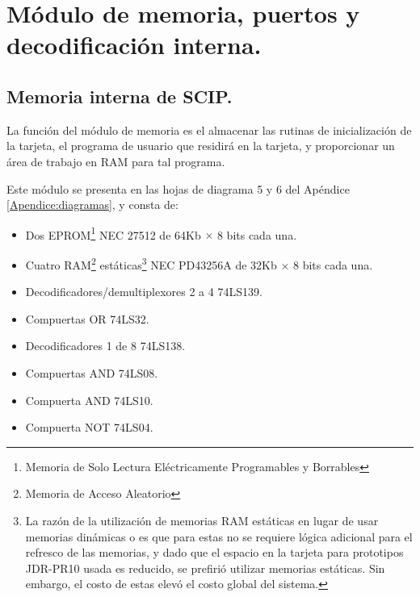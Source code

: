 \section{M\'odulo de memoria, puertos y decodificaci\'on interna.}
\label{Section:modmem}


\subsection{Memoria interna de SCIP.}
\label{Subseccion:memo}

La funci\'on del m\'odulo de memoria es el almacenar las rutinas de inicializaci\'on de la %
tarjeta, el programa de usuario que residir\'a en la tarjeta, y proporcionar un \'area de %
trabajo en RAM para tal programa.

Este m\'odulo se presenta en las hojas de diagrama 5 y 6 del Ap\'endice %
\ref{Apendice:diagramas}, y consta de:

\begin{itemize}
\item Dos EPROM\footnote{Memoria de Solo Lectura El\'ectricamente Programables y Borrables} %
NEC 27512 de 64Kb $\times$ 8 bits cada una.
\item Cuatro RAM\footnote{Memoria de Acceso Aleatorio} est\'aticas\footnote{La raz\'on de %
la utilizaci\'on de memorias RAM est\'aticas en lugar de usar memorias din\'amicas o es que %
para estas no se requiere l\'ogica adicional para el refresco de las memorias, y dado que el %
espacio en la tarjeta para prototipos JDR-PR10 usada es reducido, se prefiri\'o utilizar %
memorias est\'aticas. Sin embargo, el costo de estas elev\'o el costo global del sistema.} NEC %
PD43256A de 32Kb $\times$ 8 bits cada una.
\item Decodificadores/demultiplexores 2 a 4 74LS139.
\item Compuertas OR 74LS32.
\item Decodificadores 1 de 8 74LS138.
\item Compuertas AND 74LS08.
\item Compuerta AND 74LS10.
\item Compuerta NOT 74LS04.
\end{itemize}


